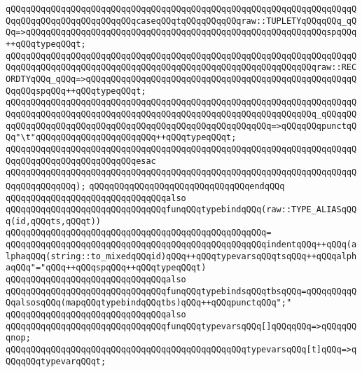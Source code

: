 \verb|qQQqqQQqqQQqqQQqqQQqqQQqqQQqqQQqqQQqqQQqqQQqqQQqqQQqqQQqqQQqqQQqqQQqqQQqqQQqqQQqqQQqqQQqqQQqqQQqcaseqQQqtqQQqqQQqqQQqraw::TUPLETYqQQqqQQq_qQQq=>qQQqqQQqqQQqqQQqqQQqqQQqqQQqqQQqqQQqqQQqqQQqqQQqqQQqqQQqqQQqspqQQq++qQQqtypeqQQqt;|\newline
\verb|qQQqqQQqqQQqqQQqqQQqqQQqqQQqqQQqqQQqqQQqqQQqqQQqqQQqqQQqqQQqqQQqqQQqqQQqqQQqqQQqqQQqqQQqqQQqqQQqqQQqqQQqqQQqqQQqqQQqqQQqqQQqqQQqqQQqraw::RECORDTYqQQq_qQQq=>qQQqqQQqqQQqqQQqqQQqqQQqqQQqqQQqqQQqqQQqqQQqqQQqqQQqqQQqqQQqspqQQq++qQQqtypeqQQqt;|\newline
\verb|qQQqqQQqqQQqqQQqqQQqqQQqqQQqqQQqqQQqqQQqqQQqqQQqqQQqqQQqqQQqqQQqqQQqqQQqqQQqqQQqqQQqqQQqqQQqqQQqqQQqqQQqqQQqqQQqqQQqqQQqqQQqqQQqqQQq_qQQqqQQqqQQqqQQqqQQqqQQqqQQqqQQqqQQqqQQqqQQqqQQqqQQqqQQqqQQq=>qQQqqQQqpunctqQQq"\t"qQQqqQQqqQQqqQQqqQQqqQQq++qQQqtypeqQQqt;|\newline
\verb|qQQqqQQqqQQqqQQqqQQqqQQqqQQqqQQqqQQqqQQqqQQqqQQqqQQqqQQqqQQqqQQqqQQqqQQqqQQqqQQqqQQqqQQqqQQqqQQqesac|\newline
\verb|qQQqqQQqqQQqqQQqqQQqqQQqqQQqqQQqqQQqqQQqqQQqqQQqqQQqqQQqqQQqqQQqqQQqqQQqqQQqqQQqqQQq);|\newline
\verb|qQQqqQQqqQQqqQQqqQQqqQQqqQQqqQQqendqQQq|\newline
\newline
\verb|qQQqqQQqqQQqqQQqqQQqqQQqqQQqqQQqalso|\newline
\verb|qQQqqQQqqQQqqQQqqQQqqQQqqQQqqQQqfunqQQqtypebindqQQq(raw::TYPE_ALIASqQQq(id,qQQqts,qQQqt))|\newline
\verb|qQQqqQQqqQQqqQQqqQQqqQQqqQQqqQQqqQQqqQQqqQQqqQQqqQQq=|\newline
\verb|qQQqqQQqqQQqqQQqqQQqqQQqqQQqqQQqqQQqqQQqqQQqqQQqqQQqindentqQQq++qQQq(alphaqQQq(string::to_mixedqQQqid)qQQq++qQQqtypevarsqQQqtsqQQq++qQQqalphaqQQq"="qQQq++qQQqspqQQq++qQQqtypeqQQqt)|\newline
\newline
\verb|qQQqqQQqqQQqqQQqqQQqqQQqqQQqqQQqalso|\newline
\verb|qQQqqQQqqQQqqQQqqQQqqQQqqQQqqQQqfunqQQqtypebindsqQQqtbsqQQq=qQQqqQQqqQQqalsosqQQq(mapqQQqtypebindqQQqtbs)qQQq++qQQqpunctqQQq";"|\newline
\newline
\verb|qQQqqQQqqQQqqQQqqQQqqQQqqQQqqQQqalso|\newline
\verb|qQQqqQQqqQQqqQQqqQQqqQQqqQQqqQQqfunqQQqtypevarsqQQq[]qQQqqQQq=>qQQqqQQqnop;|\newline
\verb|qQQqqQQqqQQqqQQqqQQqqQQqqQQqqQQqqQQqqQQqqQQqqQQqtypevarsqQQq[t]qQQq=>qQQqqQQqtypevarqQQqt;|\newline
